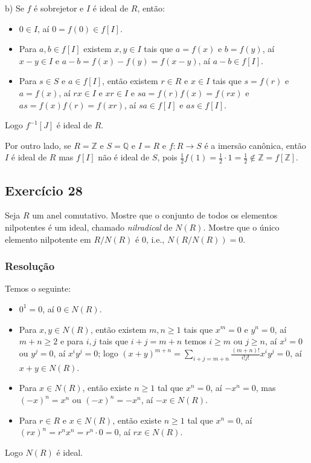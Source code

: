 \documentclass[10pt,a4paper]{article}
\begin{document}
\medskip
\noindent
b) Se $f$ é sobrejetor e $I$ é ideal de $R$, então:
\begin{itemize}
\item $0\in I$, aí $0=f(0)\in f[I]$.
\item Para $a,b\in f[I]$ existem $x,y\in I$ tais que $a=f(x)$ e $b=f(y)$, aí $x-y\in I$ e $a-b=f(x)-f(y)=f(x-y)$, aí $a-b\in f[I]$.
\item Para $s\in S$ e $a\in f[I]$, então existem $r\in R$ e $x\in I$ tais que $s=f(r)$ e $a=f(x)$, aí $rx\in I$ e $xr\in I$ e $sa=f(r)f(x)=f(rx)$ e $as=f(x)f(r)=f(xr)$, aí $sa\in f[I]$ e $as\in f[I]$.
\end{itemize}
Logo $f^{-1}[J]$ é ideal de $R$.

\medskip
\noindent
Por outro lado, se $R=\mathbb{Z}$ e $S=\mathbb{Q}$ e $I=R$ e $f:R\rightarrow S$ é a imersão canônica, então $I$ é ideal de $R$ mas $f[I]$ não é ideal de $S$, pois $\frac{1}{2}f(1)=\frac{1}{2}\cdot 1=\frac{1}{2}\notin\mathbb{Z}=f[\mathbb{Z}]$.

\subsection*{Exercício 28}
Seja $R$ um anel comutativo. Mostre que o conjunto de todos os elementos nilpotentes é um ideal, chamado \textit{nilradical} de $N(R)$. Mostre que o único elemento nilpotente em $R/N(R)$ é $0$, i.e., $N(R/N(R))=0$.

\subsubsection*{Resolução}

Temos o seguinte:
\begin{itemize}
\item $0^1=0$, aí $0\in N(R)$.
\item Para $x,y\in N(R)$, então existem $m,n\geq 1$ tais que $x^m=0$ e $y^n=0$, aí $m+n\geq 2$ e para $i,j$ tais que $i+j=m+n$ temos $i\geq m$ ou $j\geq n$, aí $x^i=0$ ou $y^j=0$, aí $x^iy^j=0$; logo $(x+y)^{m+n}=\sum_{i+j=m+n}\frac{(m+n)!}{i!j!}x^iy^j=0$, aí $x+y\in N(R)$.
\item Para $x\in N(R)$, então existe $n\geq 1$ tal que $x^n=0$, aí $-x^n=0$, mas $(-x)^n=x^n$ ou $(-x)^n=-x^n$, aí $-x\in N(R)$.
\item Para $r\in R$ e $x\in N(R)$, então existe $n\geq 1$ tal que $x^n=0$, aí $(rx)^n=r^nx^n=r^n\cdot0=0$, aí $rx\in N(R)$.
\end{itemize}
Logo $N(R)$ é ideal.
\end{document}
